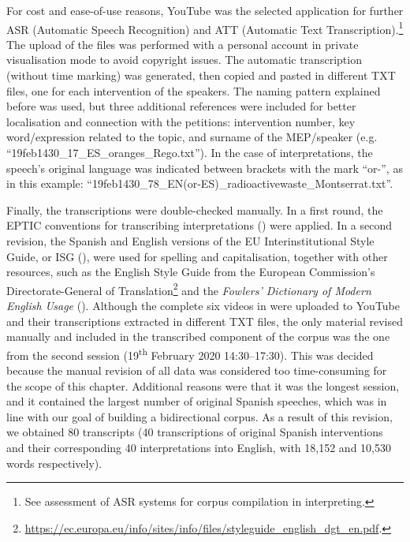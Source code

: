 \documentclass[output=paper]{langscibook}
\begin{document}
For cost and ease-of-use reasons, YouTube was the selected application for further ASR (Automatic Speech Recognition) and ATT (Automatic Text Transcription).\footnote{See  assessment of ASR systems for corpus compilation in interpreting.}  The upload of the files was performed with a personal account in private visualisation mode to avoid copyright issues. The automatic transcription (without time marking) was generated, then copied and pasted in different TXT files, one for each intervention of the speakers. The naming pattern explained before was used, but three additional references were included for better localisation and connection with the petitions:  intervention number, key word/expression related to the topic, and surname of the MEP/speaker (e.g. “19feb1430\_17\_ES\_oranges\_Rego.txt”). In the case of interpretations, the speech’s original language was indicated between brackets with the mark “or-”, as in this example: “19feb1430\_78\_EN(or-ES)\_radioactivewaste\_Montserrat.txt”.

Finally, the transcriptions were double-checked manually. In a first round, the EPTIC conventions for transcribing interpretations (\citealt[26--27]{BernardiniEtAl2018}) were applied. In a second revision, the Spanish and English versions of the EU Interinstitutional Style Guide, or ISG (\citealt{EU2021}), were used for spelling and capitalisation, together with other resources, such as the English Style Guide from the European Commission’s Directorate-General of Translation\footnote{\url{https://ec.europa.eu/info/sites/info/files/styleguide_english_dgt_en.pdf}.}  and the \textit{Fowlers’ Dictionary of Modern English Usage} (\cite{butterfield_fowlers_2015}).  Although the complete six videos in  were uploaded to YouTube and their transcriptions extracted in different TXT files, the only material revised manually and included  in the transcribed component of the corpus was the one from the second session (19\textsuperscript{th} February 2020 14:30--17:30). This was decided because the manual revision of all data was considered too time-consuming for the scope of this chapter. Additional reasons were that it was the longest session, and it contained the largest number of original Spanish speeches, which was in line with our goal of building a bidirectional corpus. As a result of this revision, we obtained 80 transcripts (40 transcriptions of original Spanish interventions and their corresponding 40 interpretations into English, with 18,152 and 10,530 words respectively).
\end{document}
